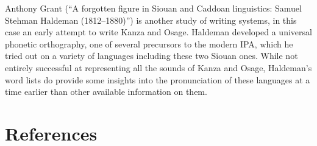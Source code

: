 \begin{refsection}
Anthony Grant (``A forgotten figure in Siouan and Caddoan linguistics: Samuel Stehman Haldeman (1812--1880)'') is another study of writing systems, in this case an early attempt to write Kanza and Osage. Haldeman developed a universal phonetic orthography, one of several precursors to the modern IPA, which he tried out on a variety of languages including these two Siouan ones. While not entirely successful at representing all the sounds of Kanza and Osage, Haldeman's word lists do provide some insights into the pronunciation of these languages at a time earlier than other available information on them. 


\section*{References}

\printbibliography[heading=subbibliography]
 

\end{refsection}
